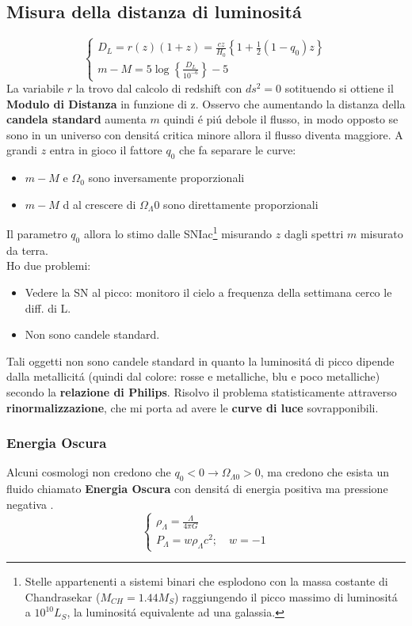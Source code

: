 \documentclass[12pt, a4paper]{article}
\begin{document}
\subsection{Misura della distanza di luminosit\'{a}}
\begin{equation}
     \begin{cases}
        D_L=r(z)(1+z)=\frac{cz}{H_0}\left\{1+\frac{1}{2}(1-q_0)z\right\}
         \\
        m-M=5\log{\left\{ \frac{D_L}{10^{-6}}\right\}-5}
     \end{cases}
\end{equation}
La variabile $r$ la trovo dal calcolo di redshift con $ds^2=0$ sotituendo si ottiene il \textbf{Modulo di Distanza} in funzione di z. Osservo che aumentando la distanza della \textbf{candela standard} aumenta $m$ quindi \'{e} pi\'{u} debole il flusso, in modo opposto se sono in un universo con densit\'{a} critica minore allora il flusso diventa maggiore. A grandi $z$ entra in gioco il fattore $q_0$ che fa separare le curve:
\begin{itemize}
    \item $m-M$ e $\Omega_0$ sono inversamente proporzionali
    \item $m-M$ d al crescere di $\Omega_\Lambda0$ sono direttamente proporzionali
\end{itemize}
Il parametro $q_0$ allora lo stimo dalle SNIac\footnote{Stelle appartenenti a sistemi binari che esplodono con la massa costante di Chandrasekar ($M_{CH}=1.44 M_S$) raggiungendo il picco massimo di luminosit\'{a} a $10^{10} L_S$, la luminosit\'a equivalente ad una galassia.} misurando $z$ dagli spettri $m$ misurato da terra.\\
Ho due  problemi:
\begin{itemize}
    \item Vedere la SN al picco: monitoro il cielo a frequenza della settimana cerco le diff. di L.
    \item Non sono candele standard.
\end{itemize}
Tali oggetti non sono candele standard in quanto la luminosit\'{a} di picco dipende dalla metallicit\'{a} (quindi dal colore: rosse e metalliche, blu e poco metalliche) secondo la \textbf{relazione di Philips}. Risolvo il problema statisticamente attraverso \textbf{rinormalizzazione}, che mi porta ad avere le \textbf{curve di luce} sovrapponibili.
\subsubsection{Energia Oscura}
Alcuni cosmologi non credono che $q_0<0 \rightarrow \Omega_{\Lambda0}>0$, ma credono che esista un fluido chiamato \textbf{Energia Oscura} con densit\'{a} di energia positiva ma pressione negativa .
\begin{equation}
     \begin{cases}
        \rho_{\Lambda}=\frac{\Lambda}{4 \pi G}
        \\
        P_{\Lambda}=w\rho_{\Lambda}c^2; \quad w=-1
     \end{cases}
\end{equation}
\newpage
\end{document}

